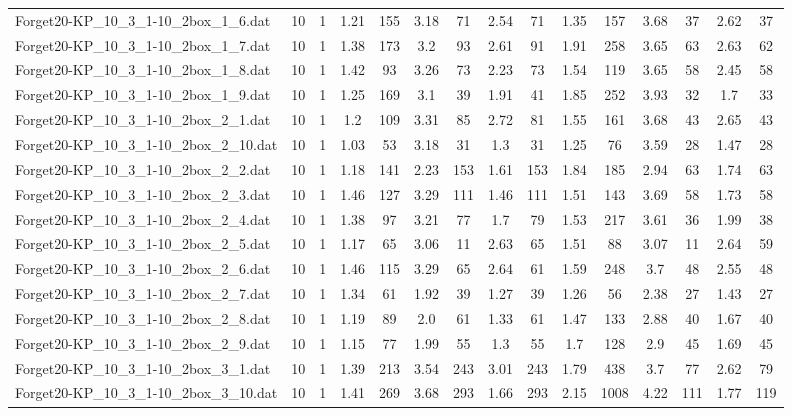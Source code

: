 \begin{table}[!ht]
{\begin{tabular}{lcccccccccccccc}
Forget20-KP\_10\_3\_1-10\_2box\_1\_6.dat & 10 & 1 & 1.21 & 155 & 3.18 & 71 & 2.54 & 71 & 1.35 & 157 & 3.68 & 37 & 2.62 & 37 \\
Forget20-KP\_10\_3\_1-10\_2box\_1\_7.dat & 10 & 1 & 1.38 & 173 & 3.2 & 93 & 2.61 & 91 & 1.91 & 258 & 3.65 & 63 & 2.63 & 62 \\
Forget20-KP\_10\_3\_1-10\_2box\_1\_8.dat & 10 & 1 & 1.42 & 93 & 3.26 & 73 & 2.23 & 73 & 1.54 & 119 & 3.65 & 58 & 2.45 & 58 \\
Forget20-KP\_10\_3\_1-10\_2box\_1\_9.dat & 10 & 1 & 1.25 & 169 & 3.1 & 39 & 1.91 & 41 & 1.85 & 252 & 3.93 & 32 & 1.7 & 33 \\
Forget20-KP\_10\_3\_1-10\_2box\_2\_1.dat & 10 & 1 & 1.2 & 109 & 3.31 & 85 & 2.72 & 81 & 1.55 & 161 & 3.68 & 43 & 2.65 & 43 \\
Forget20-KP\_10\_3\_1-10\_2box\_2\_10.dat & 10 & 1 & 1.03 & 53 & 3.18 & 31 & 1.3 & 31 & 1.25 & 76 & 3.59 & 28 & 1.47 & 28 \\
Forget20-KP\_10\_3\_1-10\_2box\_2\_2.dat & 10 & 1 & 1.18 & 141 & 2.23 & 153 & 1.61 & 153 & 1.84 & 185 & 2.94 & 63 & 1.74 & 63 \\
Forget20-KP\_10\_3\_1-10\_2box\_2\_3.dat & 10 & 1 & 1.46 & 127 & 3.29 & 111 & 1.46 & 111 & 1.51 & 143 & 3.69 & 58 & 1.73 & 58 \\
Forget20-KP\_10\_3\_1-10\_2box\_2\_4.dat & 10 & 1 & 1.38 & 97 & 3.21 & 77 & 1.7 & 79 & 1.53 & 217 & 3.61 & 36 & 1.99 & 38 \\
Forget20-KP\_10\_3\_1-10\_2box\_2\_5.dat & 10 & 1 & 1.17 & 65 & 3.06 & 11 & 2.63 & 65 & 1.51 & 88 & 3.07 & 11 & 2.64 & 59 \\
Forget20-KP\_10\_3\_1-10\_2box\_2\_6.dat & 10 & 1 & 1.46 & 115 & 3.29 & 65 & 2.64 & 61 & 1.59 & 248 & 3.7 & 48 & 2.55 & 48 \\
Forget20-KP\_10\_3\_1-10\_2box\_2\_7.dat & 10 & 1 & 1.34 & 61 & 1.92 & 39 & 1.27 & 39 & 1.26 & 56 & 2.38 & 27 & 1.43 & 27 \\
Forget20-KP\_10\_3\_1-10\_2box\_2\_8.dat & 10 & 1 & 1.19 & 89 & 2.0 & 61 & 1.33 & 61 & 1.47 & 133 & 2.88 & 40 & 1.67 & 40 \\
Forget20-KP\_10\_3\_1-10\_2box\_2\_9.dat & 10 & 1 & 1.15 & 77 & 1.99 & 55 & 1.3 & 55 & 1.7 & 128 & 2.9 & 45 & 1.69 & 45 \\
Forget20-KP\_10\_3\_1-10\_2box\_3\_1.dat & 10 & 1 & 1.39 & 213 & 3.54 & 243 & 3.01 & 243 & 1.79 & 438 & 3.7 & 77 & 2.62 & 79 \\
Forget20-KP\_10\_3\_1-10\_2box\_3\_10.dat & 10 & 1 & 1.41 & 269 & 3.68 & 293 & 1.66 & 293 & 2.15 & 1008 & 4.22 & 111 & 1.77 & 119 \\

\end{tabular}}
\end{table}
